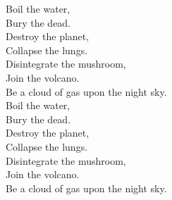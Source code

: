 Boil the water, \\
Bury the dead. \\
Destroy the planet, \\
Collapse the lungs. \\
Disintegrate the mushroom, \\
Join the volcano. \\
Be a cloud of gas upon the night sky. \\

Boil the water, \\
Bury the dead. \\
Destroy the planet, \\
Collapse the lungs. \\
Disintegrate the mushroom, \\
Join the volcano. \\
Be a cloud of gas upon the night sky. \\
